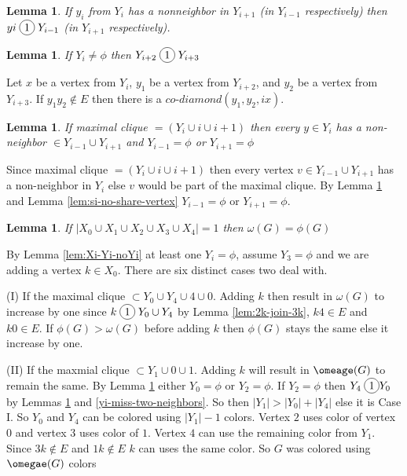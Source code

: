 \documentclass[12pt]{article}
\newcommand*\circled[1]{\tikz[baseline=(char.base)]{
            \node[shape=circle,draw,inner sep=2pt] (char) {#1};}}
\newtheorem{Lemma}[Theorem]{Lemma}
\begin{document}
{\begin{Lemma}\label{lem:yi-miss-two-neighbors}
If $y_i$ from $Y_i$ has a nonneighbor in $Y_{i+1}$ (in $Y_{i-1}$ respectively) then $yi \;\circled{1}\; Y_{i-1}$ (in $Y_{i+1}$ respectively).
\end{Lemma}

\begin{Lemma}\label{lem:yi-force-join}
If $Y_i \neq \phi$ then $Y_{i+2} \;\circled{1}\; Y_{i+3}$
\end{Lemma}
 Let $x$ be a vertex from $Y_i$, $y_1$ be a vertex from $Y_{i+2}$, and $y_2$ be a vertex from $Y_{i+3}$. If $y_1y_2\not\in E$ then there is a $co$-$diamond (y_1, y_2, ix)$. 

\begin{Lemma}\label{lem:max-clique-yi}
If maximal clique $ = (Y_i \cup i \cup i+1)$ then every $y \in Y_i$ has a non-neighbor $\in Y_{i-1} \cup Y_{i+1}$ and $Y_{i-1} = \phi$ or $Y_{i+1} = \phi$
\end{Lemma}
 Since maximal clique $ = (Y_i \cup i \cup i+1)$ then every vertex $v \in Y_{i-1} \cup Y_{i+1}$ has a non-neighbor in $Y_i$ else $v$ would be part of the maximal clique. By Lemma \ref{lem:yi-miss-two-neighbors} and Lemma \ref{lem:si-no-share-vertex} $Y_{i-1} = \phi$ or $Y_{i+1} = \phi$.

\begin{Lemma}\label{lem:add-2vertex}
If $|X_0 \cup X_1 \cup X_2 \cup X_3 \cup X_4| = 1$ then $\omega(G) =  \phi(G)$
\end{Lemma}
 By Lemma \ref{lem:Xi-Yi-noYi} at least one $Y_i = \phi$, assume $Y_3 = \phi$ and we are adding a vertex $k \in X_0$. There are six distinct cases two deal with.

(I) If the maximal clique $\subset Y_0 \cup Y_4 \cup 4 \cup 0$. Adding $k$ then result in $\omega(G)$ to increase by one since $k \;\circled{1}\; Y_0 \cup Y_4$ by Lemma \ref{lem:2k-join-3k}, $k4 \in E$ and $k0 \in E$. If $\phi(G) > \omega(G)$ before adding $k$ then $\phi(G)$ stays the same else it increase by one.

(II) If the maxmial clique $\subset Y_1 \cup 0 \cup 1$. Adding $k$ will result in $\omeage(G)$ to remain the same. By Lemma \ref{lem:max-clique-yi} either $Y_0 = \phi$ or $Y_2 = \phi$. If $Y_2 = \phi$ then $Y_4 \;\circled{1} Y_0$ by Lemmas \ref{lem:max-clique-yi} and \ref{yi-miss-two-neighbors}. So then $|Y_1| > |Y_0| + |Y_4|$ else it is Case I. So $Y_0$ and $Y_4$ can be colored using $|Y_1| - 1$ colors. Vertex $2$ uses color of vertex $0$ and vertex $3$ uses color of $1$. Vertex $4$ can use the remaining color from $Y_1$. Since $3k \not \in E$ and $1k \not \in E$ $k$ can uses the same color. So $G$ was colored using $\omegae(G)$ colors

}
\end{document}
